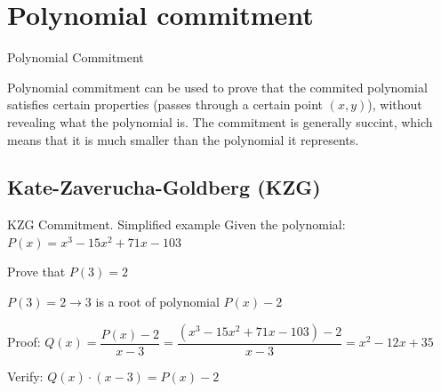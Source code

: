 \documentclass[xcolor={usenames,dvipsnames}]{beamer}
\begin{document}
    \section{Polynomial commitment}

    \begin{frame}{Polynomial Commitment}

        \begin{definition}
            Polynomial commitment can be used to prove that the commited polynomial satisfies certain properties 
            (passes through a certain point $(x,y)$), without revealing what the polynomial is.
            The commitment is generally succint, which means that it is much smaller than the polynomial it represents.        
        \end{definition}
        

    \end{frame}

    \subsection{Kate-Zaverucha-Goldberg (KZG)}
    
    \begin{frame}{KZG Commitment. Simplified example}
        Given the polynomial: $P(x) = x^3 - 15x^2 + 71x - 103$
        
        \vspace{0.5 cm}

        Prove that $P(3) = 2$

        \vspace{0.5 cm}
         
        $P(3) = 2 \rightarrow 3$ is a root of polynomial $P(x) - 2$

        \vspace{0.5 cm}

        Proof: $Q(x) = \dfrac{P(x) - 2}{x-3} = \dfrac{(x^3 - 15x^2 + 71x - 103) - 2}{x-3} = x^2 - 12x+ 35$

        \vspace{0.5 cm}

        Verify: $Q(x) \cdot (x-3) = P(x) - 2$
    \end{frame}
\end{document}
